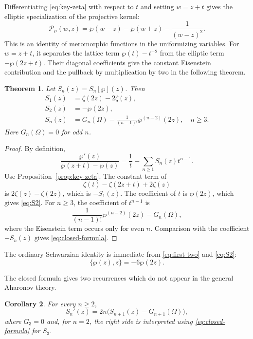 \documentclass[11pt]{amsart}
\newtheorem{thm}{Theorem}[section]
\newtheorem{cor}[thm]{Corollary}
\theoremstyle{definition}
\theoremstyle{remark}
\numberwithin{equation}{section}
\begin{document}
Differentiating \eqref{eq:key-zeta} with respect to $t$ and setting $w=z+t$ gives the elliptic specialization of the projective kernel:
\[
\mathcal P_{\wp}(w,z)
=
\wp(w-z)-\wp(w+z)-\frac1{(w-z)^2}.
\]
This is an identity of meromorphic functions in the uniformizing variables. For $w=z+t$, it separates the lattice term $\wp(t)-t^{-2}$ from the elliptic term $-\wp(2z+t)$. Their diagonal coefficients give the constant Eisenstein contribution and the pullback by multiplication by two in the following theorem.

\begin{thm}\label{thm:closed-formula}
Let $S_n(z)=S_n[\wp](z)$. Then
\begin{align}
S_1(z)&=\zeta(2z)-2\zeta(z),\label{eq:S1}\\
S_2(z)&=-\wp(2z),\label{eq:S2}\\
S_n(z)&=G_n(\Omega)-\frac{1}{(n-1)!}\wp^{(n-2)}(2z),
\quad n\geq3.\label{eq:closed-formula}
\end{align}
Here $G_n(\Omega)=0$ for odd $n$.
\end{thm}

\begin{proof}
By definition,
\[
\frac{\wp'(z)}{\wp(z+t)-\wp(z)}
=
\frac1t-\sum_{n\geq1}S_n(z)t^{n-1}.
\]
Use Proposition~\ref{prop:key-zeta}. The constant term of
\[
\zeta(t)-\zeta(2z+t)+2\zeta(z)
\]
is $2\zeta(z)-\zeta(2z)$, which is $-S_1(z)$. The coefficient of $t$ is $\wp(2z)$, which gives \eqref{eq:S2}. For $n\geq3$, the coefficient of $t^{n-1}$ is
\[
\frac{1}{(n-1)!}\wp^{(n-2)}(2z)-G_n(\Omega),
\]
where the Eisenstein term occurs only for even $n$. Comparison with the coefficient $-S_n(z)$ gives \eqref{eq:closed-formula}.
\end{proof}

The ordinary Schwarzian identity is immediate from \eqref{eq:first-two} and \eqref{eq:S2}:
\[
\{\wp(z),z\}=-6\wp(2z).
\]

The closed formula gives two recurrences which do not appear in the general Aharonov theory.

\begin{cor}\label{cor:differential-recurrence}
For every $n\geq2$,
\begin{equation}\label{eq:differential-recurrence}
S_n'(z)
=
2n\bigl(S_{n+1}(z)-G_{n+1}(\Omega)\bigr),
\end{equation}
where $G_3=0$ and, for $n=2$, the right side is interpreted using \eqref{eq:closed-formula} for $S_3$.
\end{cor}
\end{document}
